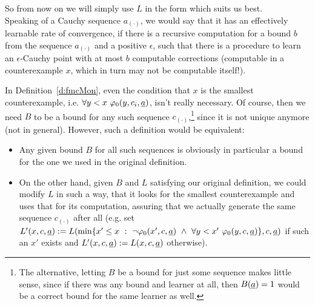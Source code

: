 So from now on we will simply use $L$ in the form which suits us best.
\\[2mm] 
Speaking of a Cauchy sequence $a_{(\cdot)}$, we would say that it has an effectively learnable rate of convergence, if there is a recursive computation for a bound $b$ from the sequence $a_{(\cdot)}$ and a positive $\epsilon$, such that there is a procedure to learn an $\epsilon$-Cauchy point with at most $b$ computable corrections (computable in a counterexample $x$, which in turn may not be computable itself!).
%
%
\begin{rmk}\label{r:smallestCE}
In Definition~\ref{d:fmcMon}, even the condition that $x$ is the smallest counterexample, i.e. $\forall y<x\ \varphi_0(y,c_i,\underline a)$, isn't really necessary. Of course, then we need $B$ to be a bound for any such sequence $c_{(\cdot)}$,\footnote{The alternative, letting $B$ be a bound for just some sequence makes little sense, since if there was any bound and learner at all, then $B(\underline a)=1$ would be a correct bound for the same learner as well.} since it is not unique anymore (not in general). However, such a definition would be equivalent:
\begin{itemize} 
\item Any given bound $B$ for all such sequences is obviously in particular a bound for the one we used in the original definition.
\item On the other hand, given $B$ and $L$ satisfying our original definition, we could modify $L$ in such a way, that it looks for the smallest counterexample and uses that for its computation, assuring that we actually generate the same sequence $c_{(\cdot)}$ after all (e.g. set 
$L'(x,c,\tup a):=L(\min \{x'\leq x\ :\  \neg\phi_0(x',c,\tup a)\ \wedge\ \forall y<x'\ \phi_0(y,c,\tup a)\},c,\tup a)$ if such an $x'$ exists and 
$L'(x,c,\underline a):=L(x,c,\underline a)$ otherwise).
\end{itemize}
\end{rmk}

